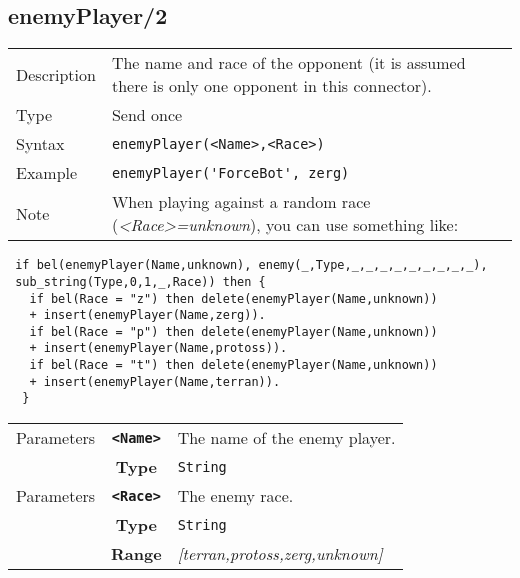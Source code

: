 \pagebreak

\subsection{enemyPlayer/2}
\begin{tabularx}{\textwidth}{lX}
 Description & The name and race of the opponent (it is assumed there is only one opponent in this connector). \\
 Type & Send once \\
 Syntax &  \verb|enemyPlayer(<Name>,<Race>)| \\
 Example & \verb|enemyPlayer('ForceBot', zerg)| \\
 Note & When playing against a random race (\textit{<Race>=unknown}), you can use something like:
 \end{tabularx}
 \begin{lstlisting}
 if bel(enemyPlayer(Name,unknown), enemy(_,Type,_,_,_,_,_,_,_,_,_),
 sub_string(Type,0,1,_,Race)) then {
   if bel(Race = "z") then delete(enemyPlayer(Name,unknown))
   + insert(enemyPlayer(Name,zerg)).
   if bel(Race = "p") then delete(enemyPlayer(Name,unknown))
   + insert(enemyPlayer(Name,protoss)).
   if bel(Race = "t") then delete(enemyPlayer(Name,unknown))
   + insert(enemyPlayer(Name,terran)).
  }
 \end{lstlisting}
 \begin{tabularx}{\textwidth}{l | c | p{8cm}|}
 \cline{2-3}
  Parameters & \textbf{\verb|<Name>|} & The name of the enemy player. \\
             & \textbf{Type} & \verb|String| \\
            \cline{2-3}
 \cline{2-3}
  Parameters & \textbf{\verb|<Race>|} & The enemy race. \\
             & \textbf{Type} & \verb|String| \\
             & \textbf{Range} & \textit{[terran,protoss,zerg,unknown]} \\
            \cline{2-3}
\end{tabularx}

